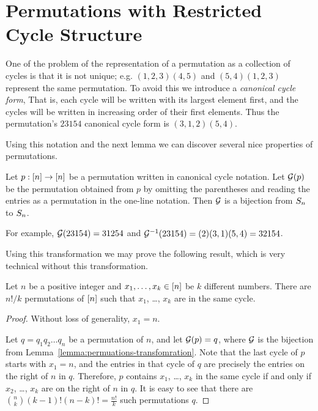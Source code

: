 \section{Permutations with Restricted Cycle Structure}
One of the problem of the representation of a permutation as a collection of
cycles is that it is not unique; e.g. $(1, 2, 3) (4, 5)$ and $(5, 4) (1, 2, 3)$
represent the same permutation. To avoid this we introduce a \emph{canonical
cycle form}, That is, each cycle will be written with its largest element first,
and the cycles will be written in increasing order of their first elements. Thus
the permutation's $2 3 1 5 4$ canonical cycle form is $(3, 1, 2) (5, 4)$.

Using this notation and the next lemma we can discover several nice properties
of permutations.
\begin{lemma}
\label{lemma:permuations-transfomration}
  Let $p : {[{n}]} \to {[{n}]}$ be a permutation written in canonical cycle notation.
  Let $\mathcal{G}(p)$ be the permutation obtained from $p$ by omitting the
  parentheses and reading the entries as a permutation in the one-line notation.
  Then $\mathcal{G}$ is a bijection from $S_{n}$ to $S_{n}$.
\end{lemma}
For example, $\mathcal{G}(2 3 1 5 4) = 31254$ and
$\mathcal{G}^{-1}(2 3 1 5 4) = (2) (3, 1) (5, 4) = 32154$.

Using this transformation we may prove the following result, which is very
technical without this transformation.
\begin{theorem}
  Let $n$ be a positive integer and $x_1, \dots, x_k \in {[{n}]}$ be $k$ different
  numbers. There are $n! / k$ permutations of ${[{n}]}$ such that $x_1$, \dots,
  $x_k$ are in the same cycle.
\end{theorem}
\begin{proof}
  Without loss of generality, $x_1 = n$.

  Let $q = q_1 q_2 \dots q_n$ be a permutation of $n$, and let $\mathcal{G}(p) = q$,
  where $\mathcal{G}$ is the bijection from
  Lemma~\ref{lemma:permuations-transfomration}.
  Note that the last cycle of $p$ starts with $x_1 = n$, and the entries in that
  cycle of $q$ are precisely the entries on the right of $n$ in $q$. Therefore,
  $p$ contains $x_1$, \dots, $x_k$ in the same cycle if and only if $x_2$,
  \dots, $x_k$ are on the right of $n$ in $q$. It is easy to see that
  there are $\binom{n}{k} (k - 1)! (n - k)! = \frac{n!}{k}$ such permutations
  $q$.
\end{proof}

